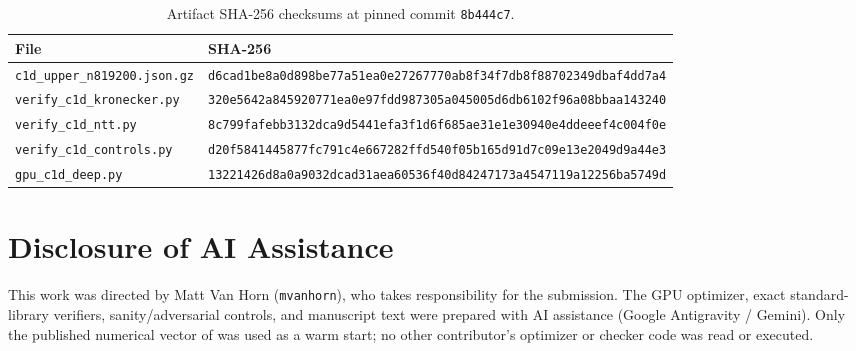 \documentclass[11pt]{article}
\begin{document}
\begin{table}[h]
\centering
\caption{Artifact SHA-256 checksums at pinned commit \texttt{8b444c7}.}
\label{tab:sha}
\footnotesize
\begin{tabular}{@{}ll@{}}
\toprule
File & SHA-256 \\
\midrule
\texttt{c1d\_upper\_n819200.json.gz} & \texttt{d6cad1be8a0d898be77a51ea0e27267770ab8f34f7db8f88702349dbaf4dd7a4} \\
\texttt{verify\_c1d\_kronecker.py} & \texttt{320e5642a845920771ea0e97fdd987305a045005d6db6102f96a08bbaa143240} \\
\texttt{verify\_c1d\_ntt.py} & \texttt{8c799fafebb3132dca9d5441efa3f1d6f685ae31e1e30940e4ddeeef4c004f0e} \\
\texttt{verify\_c1d\_controls.py} & \texttt{d20f5841445877fc791c4e667282ffd540f05b165d91d7c09e13e2049d9a44e3} \\
\texttt{gpu\_c1d\_deep.py} & \texttt{13221426d8a0a9032dcad31aea60536f40d84247173a4547119a12256ba5749d} \\
\bottomrule
\end{tabular}
\end{table}

\section{Disclosure of AI Assistance}\label{sec:disclosure}

This work was directed by Matt Van Horn (\texttt{mvanhorn}), who takes responsibility for the submission. The GPU optimizer, exact standard-library verifiers, sanity/adversarial controls, and manuscript text were prepared with AI assistance (Google Antigravity / Gemini). Only the published numerical vector of \cite{Can2026b} was used as a warm start; no other contributor's optimizer or checker code was read or executed.
\end{document}
